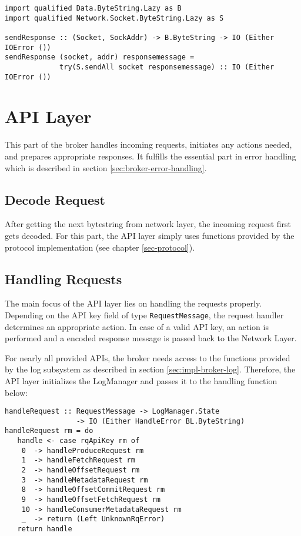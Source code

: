 \begin{lstlisting}[caption={Send response back to client via socket}]
import qualified Data.ByteString.Lazy as B
import qualified Network.Socket.ByteString.Lazy as S

sendResponse :: (Socket, SockAddr) -> B.ByteString -> IO (Either IOError ())
sendResponse (socket, addr) responsemessage = 
             try(S.sendAll socket responsemessage) :: IO (Either IOError ())
\end{lstlisting}

\newpage
\section{API Layer}
\label{sec:broker-api}

This part of the broker handles incoming
requests, initiates any actions needed, and prepares appropriate responses. It
fulfills the essential part in error handling which is described in section
\ref{sec:broker-error-handling}. 

\subsection{Decode Request}
\label{sec:impl-broker-api-handle}

After getting the next bytestring from network layer, the incoming request first
gets decoded. For this part, the API layer simply uses functions provided by the
protocol implementation (see chapter \ref{sec-protocol}).

\subsection{Handling Requests}

The main focus of the API layer lies on handling the requests properly.
Depending on the API key field of type \lstinline{RequestMessage}, the request
handler determines an appropriate action. In case of a valid API key, an action
is performed and a encoded response message is passed back to the Network Layer.

For nearly all provided APIs, the broker needs access to the functions provided
by the log subsystem as described in section \ref{sec:impl-broker-log}.
Therefore, the API layer initializes the LogManager and passes it to the
handling function below:

\begin{lstlisting}[caption={Handling requests depending on ApiKey}]
handleRequest :: RequestMessage -> LogManager.State 
                 -> IO (Either HandleError BL.ByteString)
handleRequest rm = do
   handle <- case rqApiKey rm of
    0  -> handleProduceRequest rm
    1  -> handleFetchRequest rm
    2  -> handleOffsetRequest rm
    3  -> handleMetadataRequest rm
    8  -> handleOffsetCommitRequest rm
    9  -> handleOffsetFetchRequest rm
    10 -> handleConsumerMetadataRequest rm
    _  -> return (Left UnknownRqError)
   return handle
\end{lstlisting}

